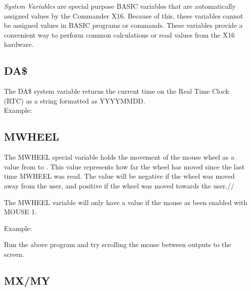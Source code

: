 \emph{System Variables} are special purpose BASIC variables that are
automatically assigned values by the Commander X16.  Because of this, these
variables cannot be assigned values in BASIC programs or commands.  These
variables provide a convenient way to perform common calculations or read
values from the X16 hardware.\\

\subsection{DA\$}

The {\ttfamily DA\$} system variable returns the current time on the Real Time
Clock (RTC) as a string formatted as YYYYMMDD.\\

Example:\\


\subsection{MWHEEL}

The {\ttfamily MWHEEL} special variable holds the movement of the mouse wheel
as a value from {} to {}.  This value represents how
far the wheel has moved since the last time {\ttfamily MWHEEL} was read.  The
value will be negative if the wheel was moved away from the user, and positive
if the wheel was moved towards the user.//

The {\ttfamily MWHEEL} variable will only have a value if the mouse as been
enabled with {\ttfamily MOUSE 1}.

Example:\\


Run the above program and try scrolling the mouse between outputs to the
screen.\\

\subsection{MX/MY}

